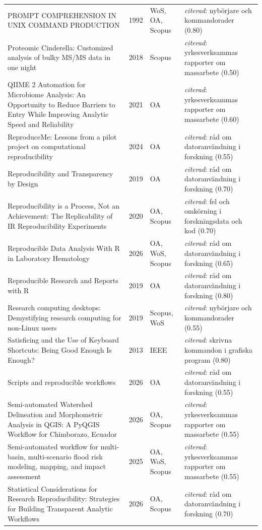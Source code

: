 \begin{longtable}{@{}%
  >{\raggedright\arraybackslash}p{}c%
  >{\raggedright\arraybackslash}p{}%
  >{\raggedright\arraybackslash}p{}@{}}
PROMPT COMPREHENSION IN UNIX COMMAND PRODUCTION & 1992 & WoS, OA, Scopus & \emph{citerad}: nybörjare och kommandorader (0.80) \\
Proteomic Cinderella: Customized analysis of bulky MS/MS data in one night & 2018 & Scopus & \emph{citerad}: yrkesverksammas rapporter om massarbete (0.50) \\
QIIME 2 Automation for Microbiome Analysis: An Opportunity to Reduce Barriers to Entry While Improving Analytic Speed and Reliability & 2021 & OA & \emph{citerad}: yrkesverksammas rapporter om massarbete (0.60) \\
ReproduceMe: Lessons from a pilot project on computational reproducibility & 2024 & OA & \emph{citerad}: råd om datoranvändning i forskning (0.55) \\
Reproducibility and Transparency by Design & 2019 & OA & \emph{citerad}: råd om datoranvändning i forskning (0.70) \\
Reproducibility is a Process, Not an Achievement: The Replicability of IR Reproducibility Experiments & 2020 & OA, Scopus & \emph{citerad}: fel och omkörning i forskningsdata och kod (0.70) \\
Reproducible Data Analysis With R in Laboratory Hematology & 2026 & OA, WoS, Scopus & \emph{citerad}: råd om datoranvändning i forskning (0.65) \\
Reproducible Research and Reports with R & 2019 & OA & \emph{citerad}: råd om datoranvändning i forskning (0.80) \\
Research computing desktops: Demystifying research computing for non-Linux users & 2019 & Scopus, WoS & \emph{citerad}: nybörjare och kommandorader (0.55) \\
Satisficing and the Use of Keyboard Shortcuts: Being Good Enough Is Enough? & 2013 & IEEE & \emph{citerad}: skrivna kommandon i grafiska program (0.80) \\
Scripts and reproducible workflows & 2026 & OA & \emph{citerad}: råd om datoranvändning i forskning (0.55) \\
Semi-automated Watershed Delineation and Morphometric Analysis in QGIS: A PyQGIS Workflow for Chimborazo, Ecuador & 2026 & OA, Scopus & \emph{citerad}: yrkesverksammas rapporter om massarbete (0.55) \\
Semi-automated workflow for multi-basin, multi-scenario flood risk modeling, mapping, and impact assessment & 2025 & OA, WoS, Scopus & \emph{citerad}: yrkesverksammas rapporter om massarbete (0.55) \\
Statistical Considerations for Research Reproducibility: Strategies for Building Transparent Analytic Workflows & 2026 & OA, Scopus & \emph{citerad}: råd om datoranvändning i forskning (0.70) \\

\end{longtable}
